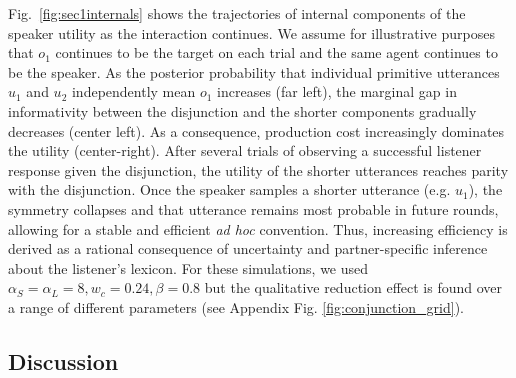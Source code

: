 Fig.~\ref{fig:sec1internals} shows the trajectories of internal components of the speaker utility as the interaction continues.
We assume for illustrative purposes that $o_1$ continues to be the target on each trial and the same agent continues to be the speaker.
As the posterior probability that individual primitive utterances $u_1$ and $u_2$ independently mean $o_1$ increases (far left), the marginal gap in informativity between the disjunction and the shorter components gradually decreases (center left).
As a consequence, production cost increasingly dominates the utility (center-right). 
After several trials of observing a successful listener response given the disjunction, the utility of the shorter utterances reaches parity with the disjunction.
Once the speaker samples a shorter utterance (e.g. $u_1$), the symmetry collapses and that utterance remains most probable in future rounds, allowing for a stable and efficient \emph{ad hoc} convention.
Thus, increasing efficiency is derived as a rational consequence of uncertainty and partner-specific inference about the listener's lexicon.
For these simulations, we used $\alpha_S = \alpha_L = 8, w_c = 0.24, \beta=0.8$ but the qualitative reduction effect is found over a range of different parameters (see Appendix Fig. \ref{fig:conjunction_grid}). 
%
%
%




\subsection{Discussion}

